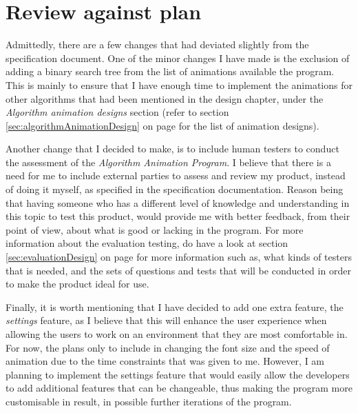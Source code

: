 \chapter{Review against plan}



Admittedly, there are a few changes that had deviated slightly from the specification document. One of the minor changes I have made is the exclusion of adding a binary search tree from the list of animations available the program. This is mainly to ensure that I have enough time to implement the animations for other algorithms that had been mentioned in the design chapter, under the \textit{Algorithm animation designs} section (refer to section \ref{sec:algorithmAnimationDesign} on page \pageref{sec:algorithmAnimationDesign} for the list of animation designs).

Another change that I decided to make, is to include human testers to conduct the assessment of the \textit{Algorithm Animation Program}. I believe that there is a need for me to include external parties to assess and review my product, instead of doing it myself, as specified in the specification documentation. Reason being that having someone who has a different level of knowledge and understanding in this topic to test this product, would provide me with better feedback, from their point of view, about what is good or lacking in the program. For more information about the evaluation testing, do have a look at section \ref{sec:evaluationDesign} on page \pageref{sec:evaluationDesign} for more information such as, what kinds of testers that is needed, and the sets of questions and tests that will be conducted in order to make the product ideal for use.

Finally, it is worth mentioning that I have decided to add one extra feature, the \textit{settings} feature, as I believe that this will enhance the user experience when allowing the users to work on an environment that they are most comfortable in. For now, the plans only to include in changing the font size and the speed of animation due to the time constraints that was given to me. However, I am planning to implement the settings feature that would easily allow the developers to add additional features that can be changeable, thus making the program more customisable in result, in possible further iterations of the program.

